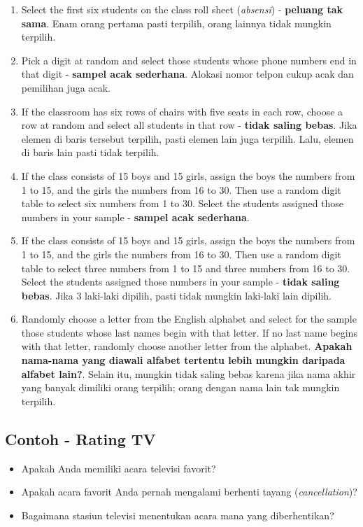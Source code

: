 \documentclass[
  letterpaper,
  DIV=11,
  numbers=noendperiod]{scrreprt}
\providecommand{\tightlist}{%
  \setlength{\itemsep}{0pt}\setlength{\parskip}{0pt}}\usepackage{longtable,booktabs,array}
\begin{document}
\begin{enumerate}
\def\labelenumi{\arabic{enumi}.}
\tightlist
\item
  Select the first six students on the class roll sheet (\emph{absensi})
  - \textbf{peluang tak sama}. Enam orang pertama pasti terpilih, orang
  lainnya tidak mungkin terpilih.
\item
  Pick a digit at random and select those students whose phone numbers
  end in that digit - \textbf{sampel acak sederhana}. Alokasi nomor
  telpon cukup acak dan pemilihan juga acak.
\item
  If the classroom has six rows of chairs with five seats in each row,
  choose a row at random and select all students in that row -
  \textbf{tidak saling bebas}. Jika elemen di baris tersebut terpilih,
  pasti elemen lain juga terpilih. Lalu, elemen di baris lain pasti
  tidak terpilih.
\item
  If the class consists of 15 boys and 15 girls, assign the boys the
  numbers from 1 to 15, and the girls the numbers from 16 to 30. Then
  use a random digit table to select six numbers from 1 to 30. Select
  the students assigned those numbers in your sample - \textbf{sampel
  acak sederhana}.
\item
  If the class consists of 15 boys and 15 girls, assign the boys the
  numbers from 1 to 15, and the girls the numbers from 16 to 30. Then
  use a random digit table to select three numbers from 1 to 15 and
  three numbers from 16 to 30. Select the students assigned those
  numbers in your sample - \textbf{tidak saling bebas}. Jika 3 laki-laki
  dipilih, pasti tidak mungkin laki-laki lain dipilih.
\item
  Randomly choose a letter from the English alphabet and select for the
  sample those students whose last names begin with that letter. If no
  last name begins with that letter, randomly choose another letter from
  the alphabet. \textbf{Apakah nama-nama yang diawali alfabet tertentu
  lebih mungkin daripada alfabet lain?}. Selain itu, mungkin tidak
  saling bebas karena jika nama akhir yang banyak dimiliki orang
  terpilih; orang dengan nama lain tak mungkin terpilih.
\end{enumerate}

\hypertarget{contoh---rating-tv}{%
\subsection{Contoh - Rating TV}\label{contoh---rating-tv}}

\begin{itemize}
\tightlist
\item
  Apakah Anda memiliki acara televisi favorit?
\item
  Apakah acara favorit Anda pernah mengalami berhenti tayang
  (\emph{cancellation})?
\item
  Bagaimana stasiun televisi menentukan acara mana yang diberhentikan?
\end{itemize}
\end{document}
